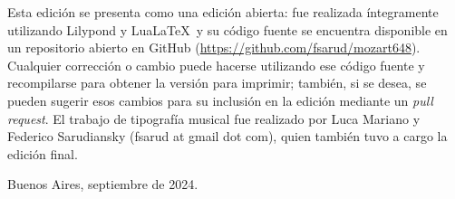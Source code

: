 Esta edición se presenta como una edición abierta: fue realizada íntegramente utilizando Lilypond y Lua\LaTeX\ y su código fuente se encuentra disponible en un repositorio abierto en GitHub (\href{https://github.com/fsarud/mozart648}{https://github.com/fsarud/mozart648}). Cualquier corrección o cambio puede hacerse utilizando ese código fuente y recompilarse para obtener la versión para imprimir; también, si se desea, se pueden sugerir esos cambios para su inclusión en la edición mediante un \emph{pull request}. El trabajo de tipografía musical fue realizado por Luca Mariano y Federico Sarudiansky (fsarud at gmail dot com), quien también tuvo a cargo la edición final. 

Buenos Aires, septiembre de 2024.

